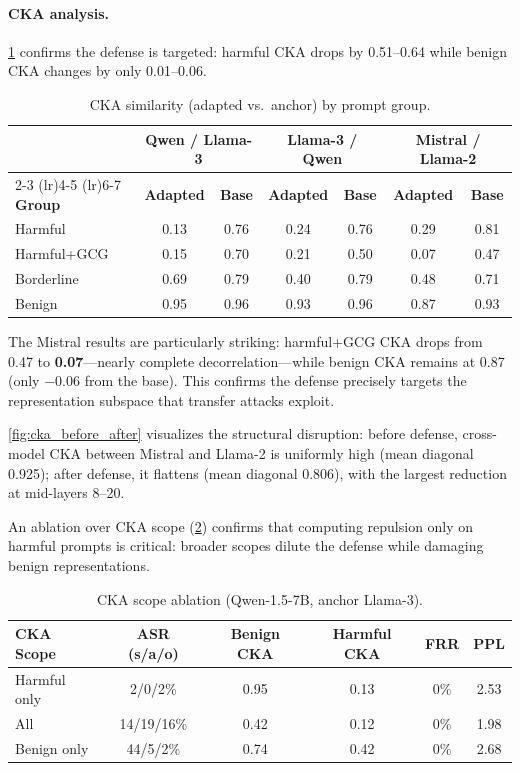 \paragraph{CKA analysis.}
\cref{tab:cka_groups} confirms the defense is targeted: harmful CKA drops by 0.51--0.64 while benign CKA changes by only 0.01--0.06.

\begin{table}[ht]
\centering
\caption{CKA similarity (adapted vs.\ anchor) by prompt group.}
\label{tab:cka_groups}
\begin{tabular}{@{}lcccccc@{}}
\toprule
 & \multicolumn{2}{c}{\textbf{Qwen / Llama-3}} & \multicolumn{2}{c}{\textbf{Llama-3 / Qwen}} & \multicolumn{2}{c}{\textbf{Mistral / Llama-2}} \\
\cmidrule(lr){2-3} \cmidrule(lr){4-5} \cmidrule(lr){6-7}
\textbf{Group} & \textbf{Adapted} & \textbf{Base} & \textbf{Adapted} & \textbf{Base} & \textbf{Adapted} & \textbf{Base} \\
\midrule
Harmful        & 0.13 & 0.76 & 0.24 & 0.76 & 0.29 & 0.81 \\
Harmful+GCG    & 0.15 & 0.70 & 0.21 & 0.50 & 0.07 & 0.47 \\
Borderline     & 0.69 & 0.79 & 0.40 & 0.79 & 0.48 & 0.71 \\
Benign         & 0.95 & 0.96 & 0.93 & 0.96 & 0.87 & 0.93 \\
\bottomrule
\end{tabular}
\end{table}

The Mistral results are particularly striking: harmful+GCG CKA drops from 0.47 to \textbf{0.07}---nearly complete decorrelation---while benign CKA remains at 0.87 (only $-0.06$ from the base). This confirms the defense precisely targets the representation subspace that transfer attacks exploit.

\cref{fig:cka_before_after} visualizes the structural disruption: before defense, cross-model CKA between Mistral and Llama-2 is uniformly high (mean diagonal 0.925); after defense, it flattens (mean diagonal 0.806), with the largest reduction at mid-layers 8--20.



An ablation over CKA scope (\cref{tab:cka_ablation}) confirms that computing repulsion only on harmful prompts is critical: broader scopes dilute the defense while damaging benign representations.

\begin{table}[ht]
\centering
\caption{CKA scope ablation (Qwen-1.5-7B, anchor Llama-3).}
\label{tab:cka_ablation}
\begin{tabular}{@{}lccccc@{}}
\toprule
\textbf{CKA Scope} & \textbf{ASR (s/a/o)} & \textbf{Benign CKA} & \textbf{Harmful CKA} & \textbf{FRR} & \textbf{PPL} \\
\midrule
Harmful only & 2/0/2\%   & 0.95 & 0.13 & 0\%   & 2.53 \\
All          & 14/19/16\% & 0.42 & 0.12 & 0\%   & 1.98 \\
Benign only  & 44/5/2\%  & 0.74 & 0.42 & 0\%   & 2.68 \\
\bottomrule
\end{tabular}
\end{table}

